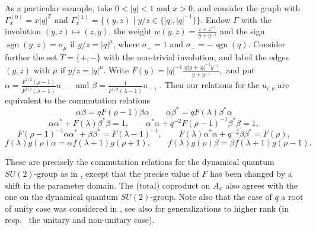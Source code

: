 \documentclass[10pt]{article}
\DeclareMathOperator{\sgn}{\mathrm{sgn}}
\newcommand{\Z}{\mathbb{Z}}
\theoremstyle{definition}
\numberwithin{equation}{section}
\begin{document}
As a particular example, take $0<|q|<1$ and $x>0$, and consider the graph with $\Gamma_x^{(0)} = x|q|^{\Z}$ and $\Gamma_x^{(1)} = \{(y,z)\mid y/z \in \{|q|,|q|^{-1}\}\}$. Endow $\Gamma$ with the involution $(y,z) \mapsto (z,y)$, the weight $w(y,z) = \frac{z+z^{-1}}{y+y^{-1}}$ and the sign $\sgn(y,z) = \sigma_{\mu}$ if $y/z = |q|^{\mu}$, where $\sigma_{+} = 1$ and $\sigma_- = -\sgn(q)$.  Consider further the set $T = \{+,-\}$ with the non-trivial involution, and label the edges $(y,z)$ with $\mu$ if $y/z = |q|^{\mu}$. Write $F(y) = |q|^{-1}\frac{|q|y+|q|^{-1}y^{-1}}{y+y^{-1}},$ and put $\alpha = \frac{F^{1/2}(\rho-1)}{F^{1/2}(\lambda-1)}u_{--}$ and $\beta = \frac{1}{F^{1/2}(\lambda-1)}u_{-+}.$ Then our relations for the $u_{\epsilon,\nu}$ are equivalent to the commutation relations \begin{equation}\label{EqqCom} \alpha \beta = qF(\rho-1)\beta\alpha \qquad \alpha\beta^* = qF(\lambda)\beta^*\alpha\end{equation} \begin{equation}\label{EqDet} \alpha\alpha^* +F(\lambda)\beta^*\beta = 1,\qquad \alpha^*\alpha+q^{-2}F(\rho-1)^{-1}\beta^*\beta = 1,\end{equation}\begin{equation*} F(\rho-1)^{-1}\alpha\alpha^* +\beta\beta^* = F(\lambda-1)^{-1},\qquad  F(\lambda)\alpha^*\alpha +q^{-2}\beta\beta^* = F(\rho),\end{equation*} \begin{equation}\label{EqGrad} f(\lambda)g(\rho)\alpha =
\alpha f(\lambda+1)g(\rho+1),\qquad f(\lambda)g(\rho)\beta = \beta f(\lambda+1)g(\rho-1).\end{equation}

These are precisely the commutation relations for the dynamical quantum $SU(2)$-group as in \cite[Definition 2.6]{KoR1}, except that the precise value of $F$ has been changed by a shift in the parameter domain. The (total) coproduct on $A_x$ also agrees with the one on the dynamical quantum $SU(2)$-group. Note also that the case of $q$ a root of unity case was considered in \cite[Section 5]{Hay7}, see also \cite{Hay4, EtN1} for generalizations to higher rank (in resp.~ the unitary and non-unitary case).




%
%

\end{document}
